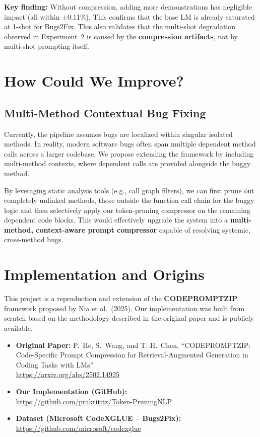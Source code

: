 \documentclass[11pt,a4paper]{article}
\begin{document}
\textbf{Key finding:} Without compression, adding more demonstrations has negligible impact (all within $\pm$0.11\%). This confirms that the base LM is already saturated at 1-shot for Bugs2Fix. This also validates that the multi-shot degradation observed in Experiment~2 is caused by the \textbf{compression artifacts}, not by multi-shot prompting itself.

\section{How Could We Improve?}

\subsection{Multi-Method Contextual Bug Fixing}

Currently, the pipeline assumes bugs are localized within singular isolated methods. In reality, modern software bugs often span multiple dependent method calls across a larger codebase. We propose extending the framework by including multi-method contexts, where dependent calls are provided alongside the buggy method.

By leveraging static analysis tools (e.g., call graph filters), we can first prune out completely unlinked methods, those outside the function call chain for the buggy logic and then selectively apply our token-pruning compressor on the remaining dependent code blocks. This would effectively upgrade the system into a \textbf{multi-method, context-aware prompt compressor} capable of resolving systemic, cross-method bugs.

\section{Implementation and Origins}

This project is a reproduction and extension of the \textbf{CODEPROMPTZIP} framework proposed by Nia et al.\ (2025). Our implementation was built from scratch based on the methodology described in the original paper and is publicly available.

\begin{itemize}[leftmargin=1.5em]
  \item \textbf{Original Paper:} P.~He, S.~Wang, and T.-H.~Chen, 
  ``CODEPROMPTZIP: Code-Specific Prompt Compression for Retrieval-Augmented Generation in Coding Tasks with LMs''\\ 
  \url{https://arxiv.org/abs/2502.14925}
  \item \textbf{Our Implementation (GitHub):}\\
  \url{https://github.com/prakrititz/Token-PruningNLP}

  \item \textbf{Dataset (Microsoft CodeXGLUE -- Bugs2Fix):}\\
  \url{https://github.com/microsoft/codexglue}
\end{itemize}
\end{document}
